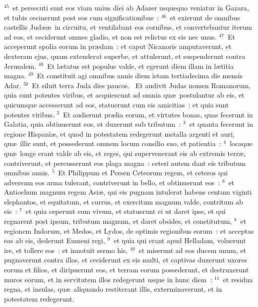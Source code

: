${}^{45}$~et persecuti sunt eos viam unius diei ab Adazer usquequo veniatur in Gazara, et tubis cecinerunt post eos cum significationibus~:
${}^{46}$~et exierunt de omnibus castellis Jud\ae \ae\ in circuitu, et ventilabant eos cornibus, et convertebantur iterum ad eos, et ceciderunt omnes gladio, et non est relictus ex eis nec unus.
${}^{47}$~Et acceperunt spolia eorum in pr\ae dam~: et caput Nicanoris amputaverunt, et dexteram ejus, quam extenderat superbe, et attulerunt, et suspenderunt contra Jerusalem.
${}^{48}$~Et l\ae tatus est populus valde, et egerunt diem illam in l\ae titia magna.
${}^{49}$~Et constituit agi omnibus annis diem istam tertiadecima die mensis Adar.
${}^{50}$~Et siluit terra Juda dies paucos.
~\lettrine[lines=10,image=true,loversize=0.05,lraise=-0.03]{E}{}t audivit Judas nomen Romanorum, quia sunt potentes viribus, et acquiescunt ad omnia qu\ae\ postulantur ab eis, et quicumque accesserunt ad eos, statuerunt cum eis amicitias~: et quia sunt potentes viribus.
${}^{2}$~Et audierunt pr\ae lia eorum, et virtutes bonas, quas fecerunt in Galatia, quia obtinuerunt eos, et duxerunt sub tributum~:
${}^{3}$~et quanta fecerunt in regione Hispani\ae , et quod in potestatem redegerunt metalla argenti et auri, qu\ae\ illic sunt, et possederunt omnem locum consilio suo, et patientia~:
${}^{4}$~locaque qu\ae\ longe erant valde ab eis, et reges, qui supervenerant eis ab extremis terr\ae , contriverunt, et percusserunt eos plaga magna~: ceteri autem dant eis tributum omnibus annis.
${}^{5}$~Et Philippum et Persen Ceteorum regem, et ceteros qui adversum eos arma tulerant, contriverunt in bello, et obtinuerunt eos~:
${}^{6}$~et Antiochum magnum regem Asi\ae , qui eis pugnam intulerat habens centum viginti elephantos, et equitatum, et currus, et exercitum magnum valde, contritum ab eis~:
${}^{7}$~et quia ceperunt eum vivum, et statuerunt ei ut daret ipse, et qui regnarent post ipsum, tributum magnum, et daret obsides, et constitutum,
${}^{8}$~et regionem Indorum, et Medos, et Lydos, de optimis regionibus eorum~: et acceptas eas ab eis, dederunt Eumeni regi,
${}^{9}$~et quia qui erant apud Helladam, voluerunt ire, et tollere eos~: et innotuit sermo his,
${}^{10}$~et miserunt ad eos ducem unum, et pugnaverunt contra illos, et ceciderunt ex eis multi, et captivas duxerunt uxores eorum et filios, et diripuerunt eos, et terram eorum possederunt, et destruxerunt muros eorum, et in servitutem illos redegerunt usque in hunc diem~:
${}^{11}$~et residua regna, et insulas, qu\ae\ aliquando restiterant illis, exterminaverunt, et in potestatem redegerunt.
